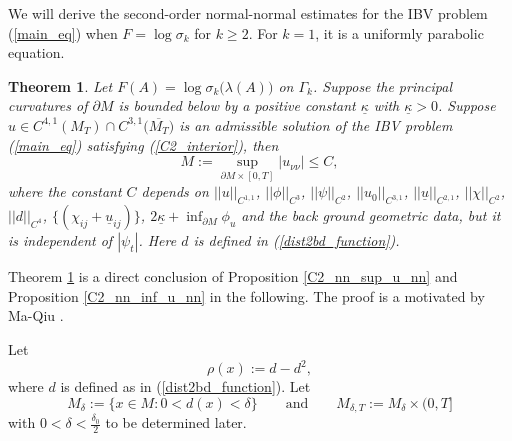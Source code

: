 \documentclass[12pt]{amsart}
\newtheorem{theorem}{Theorem}[section]
\theoremstyle{definition}
\theoremstyle{remark}
\numberwithin{equation}{section}
\begin{document}
We will derive the second-order normal-normal estimates for the IBV problem (\ref{main_eq}) when $F = \log \sigma_k$ for $k\geq 2$. For $k=1$, it is a uniformly parabolic equation. 

\begin{theorem}\label{sigma_k_u_nn_estimates}
	Let $F(A) = \log \sigma_k \big(\lambda(A)\big)$ on $\Gamma_k$. 
	Suppose the principal curvatures of $\partial M$ is bounded below by a positive constant $\underline{\kappa}$ with $\underline{\kappa} > 0$.
	Suppose $u\in C^{4,1}(M_T) \cap C^{3,1}\big(\overline{M_T}\big)$ is an admissible solution of the IBV problem (\ref{main_eq}) satisfying (\ref{C2_interior}), then
	\begin{equation}\label{C2_nn_ineq_0}
	M := \sup_{\partial M \times [0, T]} |u_{\nu\nu}| \leq C,
	\end{equation}
	where the constant $C$ depends on $||u||_{C^{1,1}}$, $||\phi||_{C^3}$, $||\psi||_{C^2}$, $||u_0||_{C^{3, 1}}$, $||\underline{u}||_{C^{2,1}}$, $||\chi||_{C^2}$, $||d||_{C^4}$, $\big\{(\chi_{ij} + \underline{u}_{ij})\big\}$, $2\underline{\kappa} + \inf_{\partial M} \phi_u$ and the back ground geometric data, but it is independent of $|\psi_t|$.
	Here $d$ is defined in (\ref{dist2bd_function}).
\end{theorem}

Theorem \ref{sigma_k_u_nn_estimates} is a direct conclusion of Proposition \ref{C2_nn_sup_u_nn} and Proposition \ref{C2_nn_inf_u_nn} in the following.
The proof is a motivated by Ma-Qiu \cite{MaQiu19}. 


Let $$\rho (x) := d - d^2,$$ where $d$ is defined as in (\ref{dist2bd_function}). Let $$M_{\delta} := \{ x \in M : 0< d(x) < \delta \} \qquad \text{and}\qquad M_{\delta, T} := M_{\delta} \times (0, T]$$ with $0 < \delta < \frac{\delta_0}{2}$ to be determined later. 
\end{document}
